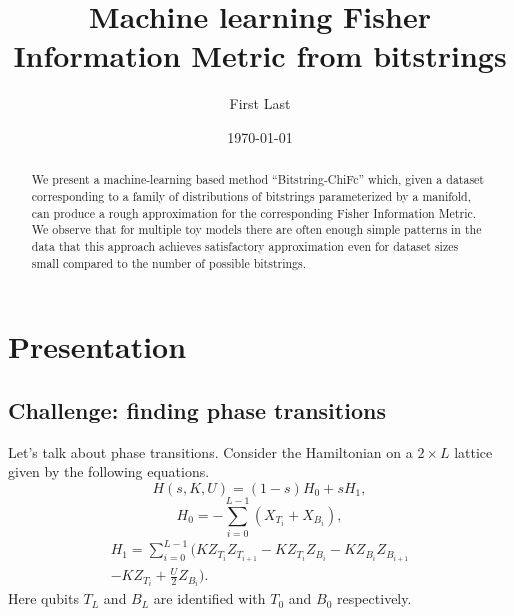 \documentclass[american,aps,pra,reprint,floatfix,nofootinbib,superscriptaddress]{revtex4-2}
\begin{document}
\title{Machine learning Fisher Information Metric from bitstrings}
\author{First Last}

\date{\today}

\begin{abstract}
We present a machine-learning based method ``Bitstring-ChiFc'' which,
given a dataset corresponding to a family of distributions of bitstrings
parameterized by a manifold, can produce a rough approximation
for the corresponding Fisher Information Metric.
We observe that for multiple toy models there are often enough simple patterns
in the data that this approach
achieves satisfactory approximation even for dataset sizes small
compared to the number of possible bitstrings.
\end{abstract}

\maketitle

\section{Presentation}
\subsection{Challenge: finding phase transitions}
Let's talk about phase transitions.  Consider the Hamiltonian
on a $2 \times L$ lattice given by the following equations.
\begin{equation}
  \label{eq:Hladder.1}
  H(s,K,U) = (1-s) H_0 + s H_1,
\end{equation}
\begin{equation}
  \label{eq:Hladder.2}
  H_0 = -\sum_{i=0}^{L-1} (X_{T_i} + X_{B_i}),
\end{equation}
\begin{multline}
  \label{eq:Hladder.3}
  H_1 = \sum_{i=0}^{L-1} \biggl(K Z_{T_i} Z_{T_{i+1}} - K Z_{T_i} Z_{B_i}
    - K Z_{B_i} Z_{B_{i+1}} \\
  - K Z_{T_i} + \frac{U}{2} Z_{B_i}\biggr).
\end{multline}
Here qubits $T_L$ and $B_L$ are identified with $T_0$ and $B_0$ respectively.
\end{document}

